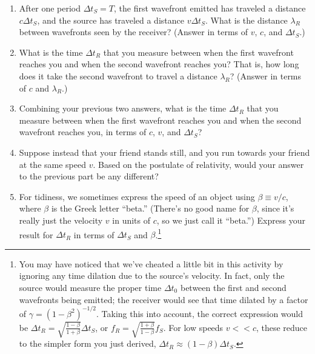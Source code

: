 \begin{enumerate}[labparts]
\item After one period $\Delta t_S=T$, the first wavefront emitted has traveled a distance $c\Delta t_S$, and the source has traveled a distance $v\Delta t_S$.  What is the distance $\lambda_R$ between wavefronts seen by the receiver?  (Answer in terms of $v$, $c$, and $\Delta t_S$.)
\answerspace{0.5in}

\item What is the time $\Delta t_R$ that you measure between when the first wavefront reaches you and when the second wavefront reaches you?  That is, how long does it take the second wavefront to travel a distance $\lambda_R$?
(Answer in terms of $c$ and $\lambda_R$.)
\answerspace{0.5in}

\item Combining your previous two answers, what is the time $\Delta t_R$ that you measure between when the first wavefront reaches you and when the second wavefront reaches you, in terms of $c$, $v$, and $\Delta t_S$?
\answerspace{0.5in}

\item Suppose instead that your friend stands still, and you run towards your friend at the same speed $v$.  Based on the postulate of relativity, would your answer to the previous part be any different?
\answerspace{0.5in}

\item For tidiness, we sometimes express the speed of an object using $\beta \equiv v/c$, where $\beta$ is the Greek letter ``beta.''  (There's no good name for $\beta$, since it's really just the velocity $v$ in units of $c$, so we just call it ``beta.'')  Express your result for $\Delta t_R$ in terms of $\Delta t_S$ and $\beta$.\footnote{
You may have noticed that we've cheated a little bit in this activity by ignoring any time dilation due to the source's velocity.  In fact, only the source would measure the proper time $\Delta t_0$ between the first and second wavefronts being emitted; the receiver would see that time dilated by a factor of $\gamma = \left(1-\beta^2\right)^{-1/2}$.  Taking this into account, the correct expression would be 
$\Delta t_R = \sqrt{\frac{1 - \beta}{1+\beta}}\Delta t_S$, or
$f_R = \sqrt{\frac{1 + \beta}{1-\beta}}f_S$.  For low speeds $v << c$, these reduce to the simpler form you just derived, $\Delta t_R \approx (1 - \beta)\Delta t_S$.
}
\answerspace{0.5in}


\end{enumerate}
